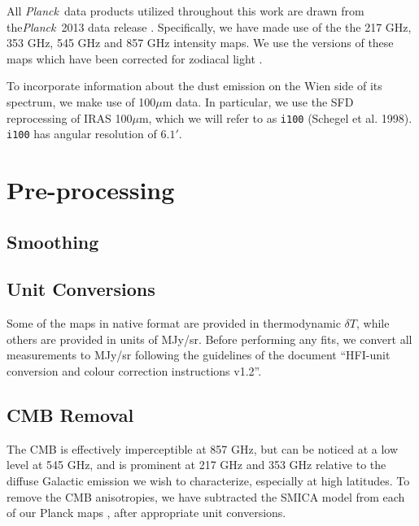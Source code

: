 \documentclass{emulateapj}
\newcommand{\PLANCK}{{\it Planck}}
\begin{document}
All \PLANCK~data products utilized throughout this work are drawn from the\PLANCK~2013 data release \citep{planck2013}. Specifically, we have made use of the
the 217 GHz, 353 GHz, 545 GHz and 857 GHz intensity maps. We use the 
versions of these maps which have been corrected for zodiacal light 
\citep[\texttt{R1.10\_nominal\_ZodiCorrected},][]{planckzodi}.



To incorporate information about the dust emission on the Wien side of its 
spectrum, we make use of 100$\mu$m data. In particular, we use the SFD 
reprocessing of IRAS 100$\mu$m, which we will refer to as \verb|i100| (Schegel et al. 1998). \verb|i100| has angular resolution of $6.1'$. %

\section{Pre-processing}

\subsection{Smoothing}


\subsection{Unit Conversions}

Some of the maps in native format are provided in thermodynamic $\delta T$, 
while others are provided in units of MJy/sr. Before performing any fits, 
we convert all measurements to MJy/sr following the guidelines of the document
``HFI-unit conversion and colour correction instructions v1.2''.


\subsection{CMB Removal}
The CMB is effectively imperceptible at 857 GHz, but can be noticed at a 
low level at 545 GHz, and is prominent at 217 GHz and 353 GHz relative 
to the diffuse Galactic emission we wish to characterize, especially at high
latitudes. To remove the CMB anisotropies, we have subtracted the SMICA model
from each of our Planck maps \citep{smica}, after appropriate unit conversions.
\end{document}
